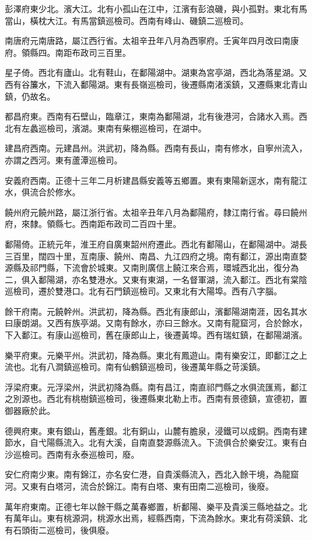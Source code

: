 彭澤府東少北。濱大江。北有小孤山在江中，江濱有彭浪磯，與小孤對。東北有馬當山，橫枕大江。有馬當鎮巡檢司。西南有峰山、磯鎮二巡檢司。

南唐府元南唐路，屬江西行省。太祖辛丑年八月為西寧府。壬寅年四月改曰南康府。領縣四。南距布政司三百里。

星子倚。西北有廬山。北有鞋山，在鄱陽湖中。湖東為宮亭湖，西北為落星湖。又西有谷簾水，下流入鄱陽湖。東有長嶺巡檢司，後遷縣南渚溪鎮，又遷縣東北青山鎮，仍故名。

都昌府東。西南有石壁山，臨章江，東南為鄱陽湖，北有後港河，合諸水入焉。西北有左蠡巡檢司，濱湖。東南有柴棚巡檢司，在湖中。

建昌府西南。元建昌州。洪武初，降為縣。西南有長山，南有修水，自寧州流入，亦謂之西河。東有蘆潭巡檢司。

安義府西南。正德十三年二月析建昌縣安義等五鄉置。東有東陽新逕水，南有龍江水，俱流合於修水。

饒州府元饒州路，屬江浙行省。太祖辛丑年八月為鄱陽府，隸江南行省。尋曰饒州府，來隸。領縣七。西南距布政司二百四十里。

鄱陽倚。正統元年，淮王府自廣東韶州府遷此。西北有鄱陽山，在鄱陽湖中。湖長三百里，闊四十里，亙南康、饒州、南昌、九江四府之境。南有鄱江，源出南直婺源縣及祁門縣，下流會於城東。又南則廣信上饒江來合焉，環城西北出，復分為二，俱入鄱陽湖，亦名雙港水。又東有東湖，一名督軍湖，流入鄱江。西北有棠陰巡檢司，遷於雙港口。北有石門鎮巡檢司。又東北有大陽埠。西有八字腦。

餘干府南。元饒幹州。洪武初，降為縣。西北有康郎山，濱鄱陽湖南涯，因名其水曰康朗湖。又西有族亭湖。又南有餘水，亦曰三餘水。又南有龍窟河，合於餘水，下入鄱江。有康山巡檢司，舊在康郎山上，後遷黃埠。西有瑞虹鎮，在鄱陽湖濱。

樂平府東。元樂平州。洪武初，降為縣。東北有鳳遊山。南有樂安江，即鄱江之上流也。北有八澗鎮巡檢司。南有仙鶴鎮巡檢司，後遷萬年縣之苛溪鎮。

浮梁府東。元浮梁州，洪武初降為縣。南有昌江，南直祁門縣之水俱流匯焉，鄱江之別源也。西北有桃樹鎮巡檢司，後遷縣東北勒上市。西南有景德鎮，宣德初，置御器廠於此。

德興府東。東有銀山，舊產銀。北有銅山，山麓有膽泉，浸鐵可以成銅。西南有建節水，自弋陽縣流入。北有大溪，自南直婺源縣流入。下流俱合於樂安江。東有白沙巡檢司。西南有永泰巡檢司，廢。

安仁府南少東。南有錦江，亦名安仁港，自貴溪縣流入，西北入餘干境，為龍窟河。又東有白塔河，流合於錦江。南有白塔、東有田南二巡檢司，後廢。

萬年府東南。正德七年以餘干縣之萬春鄉置，析鄱陽、樂平及貴溪三縣地益之。北有萬年山。東有桃源洞，桃源水出焉，經縣西南，下流為餘水。東北有荷溪鎮、北有石頭街二巡檢司，後俱廢。

